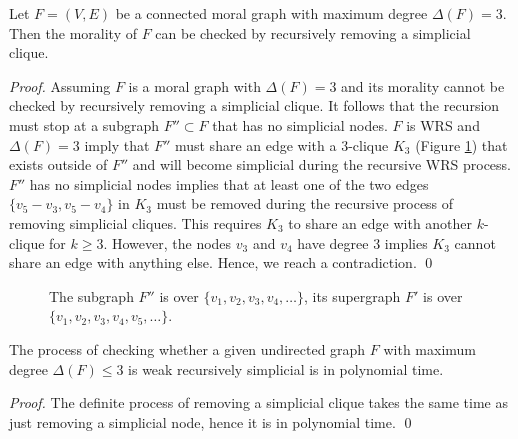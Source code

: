 \begin{theorem}
\label{thm:deg3}
Let $F=(V,E)$ be a connected moral graph with maximum degree $\Delta(F)=3$. Then the morality of $F$ can be checked by recursively removing a simplicial clique.
\end{theorem}
\begin{proof}
Assuming $F$ is a moral graph with $\Delta(F)=3$ and its morality cannot be checked by recursively removing a simplicial clique. It follows that the recursion must stop at a subgraph $F'' \subset F$ that has no simplicial nodes. $F$ is WRS and $\Delta(F)=3$ imply that $F''$ must share an edge with a $3$-clique $K_3$ (Figure \ref{fg:deg_3_dwrs}) that exists outside of $F''$ and will become simplicial during the recursive WRS process. $F''$ has no simplicial nodes implies that at least one of the two edges $\{v_5-v_3, v_5-v_4\}$ in $K_3$ must be removed during the recursive process of removing simplicial cliques. This requires $K_3$ to share an edge with another $k$-clique for $k\ge 3$. However, the nodes $v_3$ and $v_4$ have degree $3$ implies $K_3$ cannot share an edge with anything else. Hence, we reach a contradiction. \qed

\end{proof}
\begin{figure}[H]
\centering
{}
\caption{The subgraph $F''$ is over $\{v_1,v_2,v_3,v_4,\dots\}$, its supergraph $F'$ is over $\{v_1,v_2,v_3,v_4,v_5,\dots\}$.}
\label{fg:deg_3_dwrs}
\end{figure}

\begin{corollary}
The process of checking whether a given undirected graph $F$ with maximum degree $\Delta(F) \le 3$ is weak recursively simplicial is in polynomial time. 
\end{corollary}
\begin{proof}
The definite process of removing a simplicial clique takes the same time as just removing a simplicial node, hence it is in polynomial time. \qed 
\end{proof}

